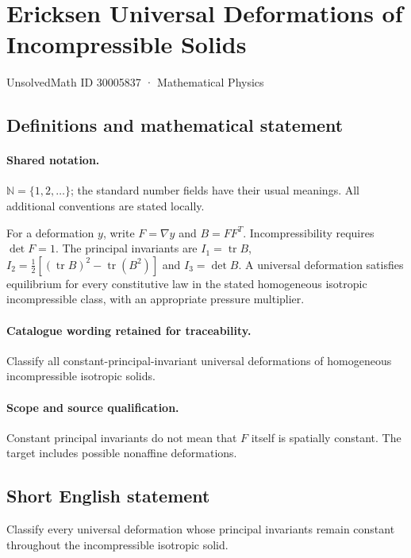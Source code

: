 \documentclass[11pt]{article}
\begin{document}
\setcounter{section}{30005836}
\section{Ericksen Universal Deformations of Incompressible Solids}\label{30005837}
{\small UnsolvedMath ID 30005837 · Mathematical Physics}
\subsection{Definitions and mathematical statement}

\paragraph{Shared notation.}$\mathbb N=\{1,2,\ldots\}$; the standard number fields have their usual meanings. All additional conventions are stated locally.


For a deformation $y$, write $F=\nabla y$ and $B=FF^T$. Incompressibility requires $\det F=1$. The principal invariants are $I_1=\operatorname{tr}B$, $I_2=\tfrac12[(\operatorname{tr}B)^2-\operatorname{tr}(B^2)]$ and $I_3=\det B$. A universal deformation satisfies equilibrium for every constitutive law in the stated homogeneous isotropic incompressible class, with an appropriate pressure multiplier.

\paragraph{Catalogue wording retained for traceability.}
Classify all constant-principal-invariant universal deformations of homogeneous incompressible isotropic solids.

\paragraph{Scope and source qualification.}Constant principal invariants do not mean that $F$ itself is spatially constant. The target includes possible nonaffine deformations.
\subsection{Short English statement}
Classify every universal deformation whose principal invariants remain constant throughout the incompressible isotropic solid.
\end{document}
